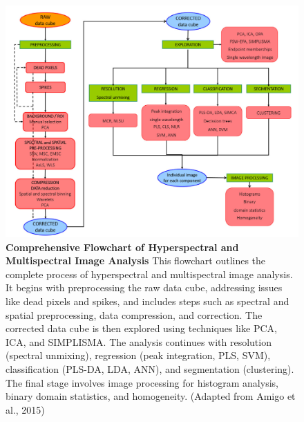 \documentclass[10pt,svgnames,fragile]{beamer}
\begin{document}
\begin{frame}
\tiny
\begin{figure}
    \centering
            \centering
            \includegraphics[width=0.62\linewidth]{amigo_chart.png}
            \caption{\textbf{Comprehensive Flowchart of Hyperspectral and Multispectral Image Analysis} This flowchart outlines the complete process of hyperspectral and multispectral image analysis. It begins with preprocessing the raw data cube, addressing issues like dead pixels and spikes, and includes steps such as spectral and spatial preprocessing, data compression, and correction. The corrected data cube is then explored using techniques like PCA, ICA, and SIMPLISMA. The analysis continues with resolution (spectral unmixing), regression (peak integration, PLS, SVM), classification (PLS-DA, LDA, ANN), and segmentation (clustering). The final stage involves image processing for histogram analysis, binary domain statistics, and homogeneity. (Adapted from Amigo et al., 2015)\cite{amigoHyperspectralMultispectralImaging2019}}
    \label{fig:amigo_chart}
\end{figure}

\end{frame}
\end{document}
